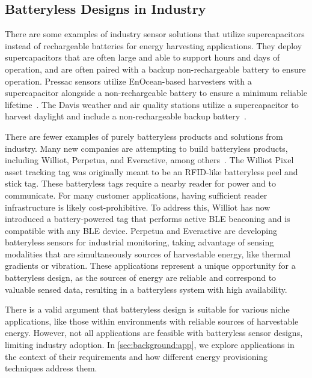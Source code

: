 \subsection{Batteryless Designs in Industry}
There are some examples of industry sensor solutions that utilize supercapacitors instead of rechargeable batteries for energy harvesting applications.
They deploy supercapacitors that are often large and able to support hours and days of operation, and are often paired with a backup non-rechargeable battery to ensure operation.
Pressac sensors utilize EnOcean-based harvesters with a supercapacitor alongside a non-rechargeable battery to ensure a minimum reliable lifetime~\cite{pressac,enocean}.
The Davis weather and air quality stations utilize a supercapacitor to harvest daylight and include a non-rechargeable backup battery~\cite{davis_weather}.

There are fewer examples of purely batteryless products and solutions from industry.
Many new companies are attempting to build batteryless products, including Williot, Perpetua, and Everactive, among others~\cite{williotpixel,perpetua,everactive}.
The Williot Pixel asset tracking tag was originally meant to be an RFID-like batteryless peel and stick tag. These batteryless tags require a nearby reader for power and to communicate.
For many customer applications, having sufficient reader infrastructure is likely cost-prohibitive.
To address this, Williot has now introduced a battery-powered tag that performs active BLE beaconing and is compatible with any BLE device.
Perpetua and Everactive are developing batteryless sensors for industrial monitoring, taking advantage of sensing modalities that are simultaneously sources of harvestable energy, like thermal gradients or vibration.
These applications represent a unique opportunity for a batteryless design, as the sources of energy are reliable and correspond to valuable sensed data, resulting in a batteryless system with high availability.


There is a valid argument that batteryless design is suitable for various niche applications, like those within environments with reliable sources of harvestable energy.
However, not all applications are feasible with batteryless sensor designs, limiting industry adoption.
In \cref{sec:background:app}, we explore applications in the context of their requirements and how different energy provisioning techniques address them.


